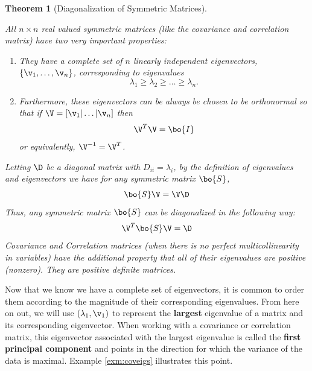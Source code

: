 \documentclass[
]{article}
\providecommand{\tightlist}{%
  \setlength{\itemsep}{0pt}\setlength{\parskip}{0pt}}
\newtheorem{theorem}{Theorem}[section]
\theoremstyle{definition}
\theoremstyle{definition}
\theoremstyle{definition}
\theoremstyle{definition}
\theoremstyle{remark}
\begin{document}
\begin{theorem}[Diagonalization of Symmetric Matrices]
\protect\hypertarget{thm:eigsym}{}\label{thm:eigsym}

All \(n\times n\) real valued symmetric matrices (like the covariance and correlation matrix) have two very important properties:

\begin{enumerate}
\def\labelenumi{\arabic{enumi}.}
\tightlist
\item
  They have a complete set of \(n\) linearly independent eigenvectors, \(\{\v_1,\dots,\v_n\}\), corresponding to eigenvalues \[\lambda_1 \geq \lambda_2 \geq\dots\geq \lambda_n.\]
\item
  Furthermore, these eigenvectors can be always be chosen to be \emph{orthonormal} so that if \(\V=[\v_1|\dots|\v_n]\) then
  \[\V^{T}\V=\bo{I}\]
  or equivalently, \(\V^{-1}=\V^{T}\).
\end{enumerate}

Letting \(\D\) be a diagonal matrix with \(D_{ii}=\lambda_i\), by the definition of eigenvalues and eigenvectors we have for any symmetric matrix \(\bo{S}\),
\[\bo{S}\V=\V\D\]
Thus, any symmetric matrix \(\bo{S}\) can be diagonalized in the following way:
\[\V^{T}\bo{S}\V=\D\]
Covariance and Correlation matrices (when there is no perfect multicollinearity in variables) have the additional property that all of their eigenvalues are positive (nonzero). They are \emph{positive definite} matrices.

\end{theorem}

Now that we know we have a complete set of eigenvectors, it is common to order them according to the magnitude of their corresponding eigenvalues. From here on out, we will use \((\lambda_1,\v_1)\) to represent the \textbf{largest} eigenvalue of a matrix and its corresponding eigenvector. When working with a covariance or correlation matrix, this eigenvector associated with the largest eigenvalue is called the \textbf{first principal component} and points in the direction for which the variance of the data is maximal. Example \ref{exm:coveigs} illustrates this point.
\end{document}
